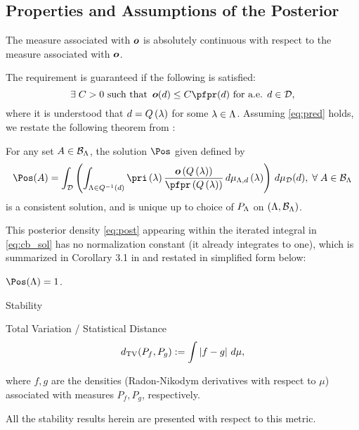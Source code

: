 \subsection{Properties and Assumptions of the Posterior}
\begin{frame}[t]
\begin{assumption}\label{as:pred}
The measure associated with $\operatorname*{\boldsymbol{o}}$ is absolutely continuous with respect to the measure associated with $\operatorname*{\boldsymbol{o}}$.
\end{assumption}


The requirement is guaranteed if the following is satisfied:
\begin{equation}\label{eq:pred}
\exists \; C>0 \text{ such that } \obs (d) \leq C \pfpr(d) \text{ for a.e. } d\in \dspace,
\end{equation}
where it is understood that $d = Q\left ( \lambda \right )$ for some $\lambda \in {\Lambda}$.
Assuming \eqref{eq:pred} holds, we restate the following theorem from \cite{BJW18}:
\begin{theorem}
For any set $A\in \mathcal{B}_{{\Lambda}}$, the solution $\Pos$ given defined by
\begin{equation}\label{eq:cb_sol}
\Pos (A) = \int_\dspace \left (  \int_{\pspace \in Q^{-1}(d)}  \pri\lam \frac{\obs\q}{\pfpr\q} \, d\mu_{\pspace, d} \lam \right ) \, d\mu_\dspace(d), \; \forall \; A \in \pborel
\end{equation} 
is a consistent solution, and is unique up to choice of $P_{\Lambda}$ on $({\Lambda}, \mathcal{B}_{{\Lambda}})$.
\end{theorem}

\end{frame}

\begin{frame}[t]

This posterior density \eqref{eq:post} appearing within the iterated integral in \eqref{eq:cb_sol} has no normalization constant (it already integrates to one), which is summarized in Corollary 3.1 in \cite{BJW18} and restated in simplified form below:
\begin{corollary}\label{cor:int}
$\Pos(\pspace) = 1$.
\end{corollary}

\end{frame}




\begin{frame}[t]{Stability}

\begin{defn}{Total Variation / Statistical Distance}
	\begin{equation}\label{eq:tv}
		d_{\text{TV}} (P_f, P_g) := \int \left\vert f - g\right\vert \, d\mu,
	\end{equation}
\end{defn}
where $f,g$ are the densities (Radon-Nikodym derivatives with respect to $\mu$) associated with measures $P_f, P_g$, respectively.

All the stability results herein are presented with respect to this metric.
\end{frame}

